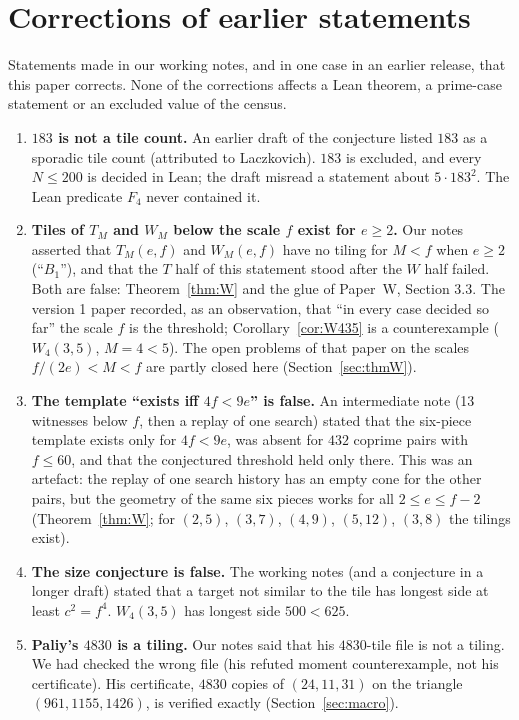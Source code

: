 \documentclass[11pt,reqno]{amsart}
\theoremstyle{plain}
\theoremstyle{definition}
\begin{document}
\section{Corrections of earlier statements}\label{app:corr}
Statements made in our working notes, and in one case in an earlier release, that this paper corrects. None of the corrections affects a Lean theorem, a prime-case statement or an excluded value of the census.
\begin{enumerate}
\item \textbf{$183$ is not a tile count.} An earlier draft of the conjecture listed $183$ as a sporadic tile count (attributed to Laczkovich). $183$ is excluded, and every $N\le200$ is decided in Lean; the draft misread a statement about $5\cdot183^2$. The Lean predicate $F_4$ never contained it.
\item \textbf{Tiles of $T_M$ and $W_M$ below the scale $f$ exist for $e\ge2$.} Our notes asserted that $T_M(e,f)$ and $W_M(e,f)$ have no tiling for $M<f$ when $e\ge2$ (``$B_1$''), and that the $T$ half of this statement stood after the $W$ half failed. Both are false: Theorem~\ref{thm:W} and the glue of Paper~W, Section 3.3. The version 1 paper \cite{ReleasePaper} recorded, as an observation, that ``in every case decided so far'' the scale $f$ is the threshold; Corollary~\ref{cor:W435} is a counterexample ($W_4(3,5)$, $M=4<5$). The open problems of that paper on the scales $f/(2e)<M<f$ are partly closed here (Section~\ref{sec:thmW}).
\item \textbf{The template ``exists iff $4f<9e$'' is false.} An intermediate note (13 witnesses below $f$, then a replay of one search) stated that the six-piece template exists only for $4f<9e$, was absent for $432$ coprime pairs with $f\le60$, and that the conjectured threshold held only there. This was an artefact: the replay of one search history has an empty cone for the other pairs, but the geometry of the same six pieces works for all $2\le e\le f-2$ (Theorem~\ref{thm:W}; for $(2,5)$, $(3,7)$, $(4,9)$, $(5,12)$, $(3,8)$ the tilings exist).
\item \textbf{The size conjecture is false.} The working notes (and a conjecture in a longer draft) stated that a target not similar to the tile has longest side at least $c^2=f^4$. $W_4(3,5)$ has longest side $500<625$.
\item \textbf{Paliy's $4830$ is a tiling.} Our notes said that his $4830$-tile file is not a tiling. We had checked the wrong file (his refuted moment counterexample, not his certificate). His certificate, $4830$ copies of $(24,11,31)$ on the triangle $(961,1155,1426)$, is verified exactly (Section~\ref{sec:macro}).

\end{enumerate}
\end{document}
